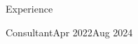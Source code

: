 \documentclass[10pt, letter]{article}
\begin{document}
\begin{cvsection}{Experience}
{\begin{itemize}
        \end{itemize}
    }{Consultant}{Apr 2022}{Aug 2024}


\end{cvsection}
\end{document}
